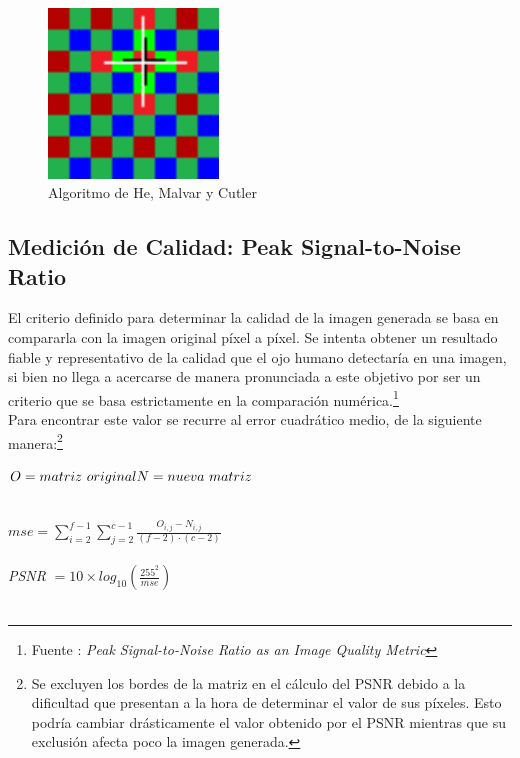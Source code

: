 \documentclass[a4paper]{article}
\begin{document}
\begin{figure}[htbp]
\centering
\includegraphics[width=128pt]{img/BA3.png}       %
\caption{Algoritmo de He, Malvar y Cutler}
\end{figure}

\subsection{Medición de Calidad: Peak Signal-to-Noise Ratio}

El criterio definido para determinar la calidad de la imagen generada se basa en compararla con la imagen original píxel a píxel. Se intenta obtener un resultado fiable y representativo de la calidad que el ojo humano detectaría en una imagen, si bien no llega a acercarse de manera pronunciada a este objetivo por ser un criterio que se basa estrictamente en la comparación numérica.\footnote{Fuente : \textit{Peak Signal-to-Noise Ratio as an Image Quality Metric}} \\
Para encontrar este valor se recurre al error cuadrático medio, de la siguiente manera:\footnote{Se excluyen los bordes de la matriz en el cálculo del PSNR debido a la dificultad que presentan a la hora de determinar el valor de sus píxeles. Esto podría cambiar drásticamente el valor obtenido por el PSNR mientras que su exclusión afecta poco la imagen generada.} \\

\begin{footnotesize}
\noindent $O=matriz\ original\\  N=nueva\ matriz$\\ \\
\end{footnotesize}
\begin{large}
$mse = \sum_{i=2}^{f-1}\sum_{j=2}^{c-1}\frac{ O_{i,j} - N_{i,j}}{(f-2) \cdot (c-2)}$\\ \\

\textit{PSNR} $= 10 \times log_{10}\left (\frac{255^2}{mse} \right )$\\ \\
\end{large}
\end{document}
